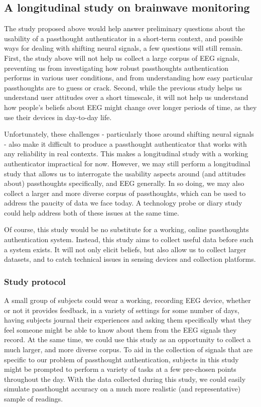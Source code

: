 \documentclass[sigconf]{acmart}
\begin{document}
\subsection{A longitudinal study on brainwave monitoring}
\label{sec:orgc109281}

The study proposed above would help answer preliminary questions about
the usability of a passthought authenticator in a short-term context,
and possible ways for dealing with shifting neural signals,
a few questions will still remain.
First, the study above will not help us collect a large corpus of EEG signals, 
preventing us from investigating how robust passthoughts authentication performs in various user conditions,
and from understanding how easy particular passthoughts are to guess or crack.
Second, while the previous study helps us understand user attitudes over a short timescale,
it will not help us understand how people's beliefs about EEG might change over longer periods of time, as they use their devices in day-to-day life.

Unfortunately, these challenges - particularly those around shifting neural signals - also make it difficult to produce a passthought authenticator that works with any reliability in real contexts.
This makes a longitudinal study with a working authenticator impractical for now.
However, we may still perform a longitudinal study that allows us to interrogate the usability aspects around (and attitudes about) passthoughts specifically, and EEG generally.
In so doing, we may also collect a larger and more diverse corpus of passthoughts, which can be used to address the paucity of data we face today.
A technology probe or diary study \cite{Gaver1999} could help address both of these issues at the same time.

Of course, this study would be no substitute for a working, online passthoughts authentication system.
Instead, this study aims to collect useful data before such a system exists.
It will not only elicit beliefs, 
but also allow us to collect larger datasets, 
and to catch technical issues in sensing devices and collection platforms.

\subsubsection{Study protocol}
\label{sec:org25d4283}
A small group of subjects could wear a working, recording EEG device, whether or not it provides feedback, in a variety of settings for some number of days,
having subjects journal their experiences and asking them specifically what they feel someone might be able to know about them from the EEG signals they record.
At the same time, we could use this study as an opportunity to collect a much larger, and more diverse corpus.
To aid in the collection of signals that are specific to our problem of passthought authentication,
subjects in this study might be prompted to perform a variety of tasks at a few pre-chosen points throughout the day.
With the data collected during this study, we could easily simulate passthought accuracy on a much more realistic (and representative) sample of readings.
\end{document}
